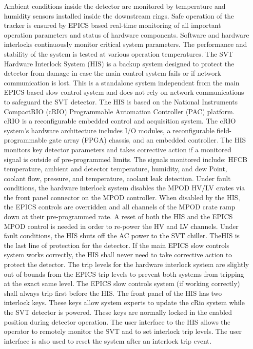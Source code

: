 Ambient conditions inside the detector are monitored by temperature and humidity sensors installed inside the downstream rings. Safe operation of the tracker is ensured by EPICS based real-time monitoring of all important operation parameters and status of hardware components. Software and hardware interlocks continuously monitor critical system parameters. The performance and stability of the system is tested at various operation temperatures. 
The SVT Hardware Interlock System (HIS) is a backup system designed to protect the detector from damage in case the main control system fails or if network communication is lost. This is a standalone system independent from the main EPICS-based slow control system and does not rely on network communications to safeguard the SVT detector. The HIS is based on the National Instruments CompactRIO (cRIO) Programmable Automation Controller (PAC) platform. cRIO is a reconfigurable embedded control and acquisition system. The cRIO system's hardware architecture includes I/O modules, a reconfigurable field-programmable gate array (FPGA) chassis, and an embedded controller. The HIS monitors key detector parameters and takes corrective action if a monitored signal is outside of pre-programmed limits. The signals monitored include: HFCB temperature, ambient and detector temperature, humidity, and dew Point, coolant flow, pressure, and temperature, coolant leak detection. Under fault conditions, the hardware interlock system disables the MPOD HV/LV crates via the front panel connector on the MPOD controller. When disabled by the HIS, the EPICS controls are overridden and all channels of the MPOD crate ramp down at their pre-programmed rate. A reset of both the HIS and the EPICS MPOD control is needed in order to re-power the HV and LV channels. Under fault conditions, the HIS shuts off the AC power to the SVT chiller. 
TheHIS is the last line of protection for the detector. If the main EPICS slow controls system works correctly, the HIS shall never need to take corrective action to protect the detector. The trip levels for the hardware interlock system are slightly out of bounds from the EPICS trip levels to prevent both systems from tripping at the exact same level. The EPICS slow controls system (if working correctly) shall always trip first before the HIS. 
The front panel of the HIS has two interlock keys. These keys allow system experts to update the cRio system while the SVT detector is powered. These keys are normally locked in the enabled position during detector operation.
The user interface to the HIS allows the operator to remotely monitor the SVT and to set interlock trip levels. The user interface is also used to reset the system after an interlock trip event. 

